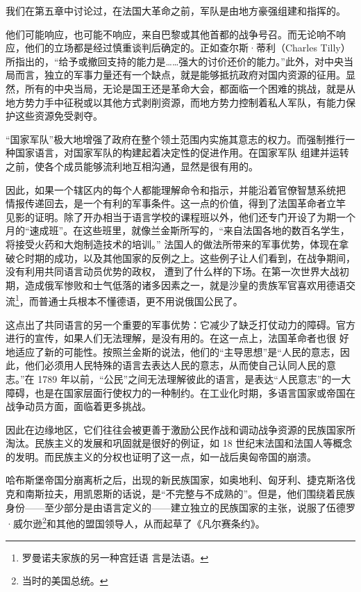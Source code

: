 我们在第五章中讨论过，在法国大革命之前，军队是由地方豪强组建和指挥的。

他们可能响应，也可能不响应，来自巴黎或其他首都的战争号召。而无论响不响应，他们的立场都是经过慎重谈判后确定的。正如查尔斯·蒂利（Charles Tilly）所指出的，“给予或撤回支持的能力是……强大的讨价还价的能力。”此外，对中央当局而言，独立的军事力量还有一个缺点，就是能够抵抗政府对国内资源的征用。显然，所有的中央当局，无论是国王还是革命大会，都面临一个困难的挑战，就是从地方势力手中征税或以其他方式剥削资源，而地方势力控制着私人军队，有能力保护这些资源免受剥夺。

“国家军队”极大地增强了政府在整个领土范围内实施其意志的权力。而强制推行一种国家语言，对国家军队的构建起着决定性的促进作用。在国家军队 组建并运转之前，使各个成员能够流利地互相沟通，显然是很有用的。

因此，如果一个辖区内的每个人都能理解命令和指示，并能沿着官僚智慧系统把 情报传递回去，是一个有利的军事条件。这一点的价值，得到了法国革命者立竿 见影的证明。除了开办相当于语言学校的课程班以外，他们还专门开设了为期一个月的“速成班”。在这些班里，就像兰金斯所写的，“来自法国各地的数百名学生，将接受火药和大炮制造技术的培训。” 法国人的做法所带来的军事优势，体现在拿破仑时期的成功，以及其他国家的反例之上。这些例子让人们看到，在战争期间，没有利用共同语言动员优势的政权， 遭到了什么样的下场。在第一次世界大战初期，造成俄军惨败和士气低落的诸多因素之一，就是沙皇的贵族军官喜欢用德语交流\footnote{罗曼诺夫家族的另一种宫廷语 言是法语。}，而普通士兵根本不懂德语，更不用说俄国公民了。

这点出了共同语言的另一个重要的军事优势：它减少了缺乏打仗动力的障碍。官方进行的宣传，如果人们无法理解，是没有用的。在这一点上，法国革命者也很 好地适应了新的可能性。按照兰金斯的说法，他们的“主导思想”是“人民的意志，因此，他们必须用人民特殊的语言去表达人民的意志，从而使自己认同人民的意志。”在 1789 年以前，“公民”之间无法理解彼此的语言，是表达“人民意志”的一大障碍，也是在国家层面行使权力的一种制约。在工业化时期，多语言国家或帝国在战争动员方面，面临着更多挑战。

因此在边缘地区，它们往往会被更善于激励公民作战和调动战争资源的民族国家所淘汰。民族主义的发展和巩固就是很好的例证，如 18 世纪末法国和法国人等概念的发明。而民族主义的分权也证明了这一点，如一战后奥匈帝国的崩溃。

哈布斯堡帝国分崩离析之后，出现的新民族国家，如奥地利、匈牙利、捷克斯洛伐克和南斯拉夫，用凯恩斯的话说，是“不完整与不成熟的”。但是，他们围绕着民族身份——至少部分是由语言定义的——建立独立的民族国家的主张，说服了伍德罗·威尔逊\footnote{当时的美国总统。}和其他的盟国领导人，从而起草了《凡尔赛条约》。

